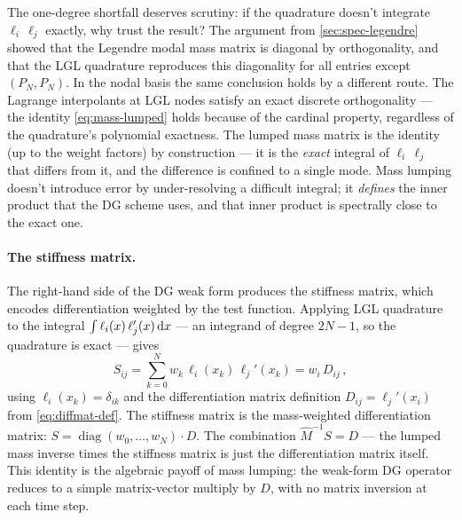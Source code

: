 The one-degree shortfall deserves scrutiny: if the quadrature doesn't
integrate $\ell_i\,\ell_j$ exactly, why trust the result?  The
argument from \cref{sec:spec-legendre} showed that the Legendre modal
mass matrix is diagonal by orthogonality, and that the LGL quadrature
reproduces this diagonality for all entries except $(P_N, P_N)$.
In the nodal basis the same conclusion holds by a different route.
The Lagrange interpolants at LGL nodes satisfy an exact
discrete orthogonality --- the identity \cref{eq:mass-lumped}
holds because of the cardinal property, regardless of the
quadrature's polynomial exactness.  The lumped mass matrix is the
identity (up to the weight factors) by construction --- it is the
\emph{exact} integral of $\ell_i\,\ell_j$ that differs from it, and
the difference is confined to a single mode.  Mass lumping doesn't
introduce error by under-resolving a difficult integral; it
\emph{defines} the inner product that the DG scheme uses, and that
inner product is spectrally close to the exact one.

\paragraph{The stiffness matrix.}

The right-hand side of the DG weak form produces the stiffness
matrix, which encodes differentiation weighted by the test function.
Applying LGL quadrature to the integral
$\int \ell_i(x)\,\ell_j'(x)\,\mathrm{d} x$ --- an integrand of degree
$2N - 1$, so the quadrature is exact --- gives
%
\begin{equation}
  S_{ij} = \sum_{k=0}^{N} w_k\,\ell_i(x_k)\,\ell_j'(x_k)
  = w_i\,D_{ij} \,,
  \label{eq:stiffness-matrix}
\end{equation}
%
using $\ell_i(x_k) = \delta_{ik}$ and the differentiation matrix
definition $D_{ij} = \ell_j'(x_i)$ from \cref{eq:diffmat-def}.
The stiffness matrix is the mass-weighted differentiation matrix:
$S = \operatorname{diag}(w_0, \ldots, w_N) \cdot D$.  The
combination $\hat{M}^{-1} S = D$ --- the lumped mass inverse times
the stiffness matrix is just the differentiation matrix itself.
This identity is the algebraic payoff of mass lumping: the weak-form
DG operator reduces to a simple matrix-vector multiply by $D$,
with no matrix inversion at each time step.


